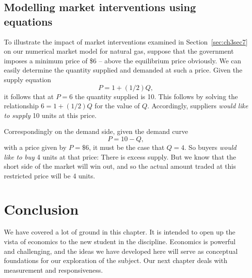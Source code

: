 \newhtmlpage

\subsection*{Modelling market interventions using equations}

To illustrate the impact of market interventions examined in Section~\ref{sec:ch3sec7} on
our numerical market model for natural gas, suppose that the
government imposes a minimum price of \$6 -- above the equilibrium price
obviously. We can easily determine the quantity supplied and demanded at
such a price. Given the supply equation
\begin{equation*}
P=1+(1/2)Q, 
\end{equation*}
it follows that at $P=6$ the quantity supplied is 10. This follows by solving
the relationship $6=1+(1/2)Q$ for the value of $Q$. Accordingly, suppliers
\textit{would like to supply} 10 units at this price.

Correspondingly on the demand side, given the demand curve
\begin{equation*}
P=10-Q, 
\end{equation*}
with a price given by $P=\$6$, it must be the case that $Q=4$. So buyers 
\textit{would like to buy} 4 units at that price: There is excess supply.
But we know that the short side of the market will win out, and so the
actual amount traded at this restricted price will be 4 units.

\section*{Conclusion}

We have covered a lot of ground in this chapter. It is intended to open up
the vista of economics to the new student in the discipline. Economics is
powerful and challenging, and the ideas we have developed here will serve as
conceptual foundations for our exploration of the subject. Our next chapter
deals with measurement and responsiveness.
